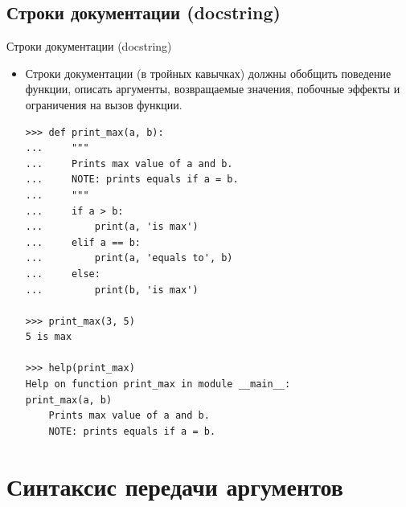 \documentclass[aspectratio=169]{beamer}%
\begin{document}
\subsection{Строки документации (docstring)}
\begin{frame}[fragile]{Строки документации (docstring)}

\scriptsize
\begin{itemize}
\item Строки документации (в тройных кавычках) должны обобщить поведение функции, описать аргументы, возвращаемые значения, побочные эффекты и ограничения на вызов функции.

\begin{verbatim}
>>> def print_max(a, b):
...     """ 
...     Prints max value of a and b.
...     NOTE: prints equals if a = b.
...     """
...     if a > b:
...         print(a, 'is max') 
...     elif a == b:
...         print(a, 'equals to', b)
...     else:
...         print(b, 'is max')

>>> print_max(3, 5)
5 is max

>>> help(print_max)
Help on function print_max in module __main__:
print_max(a, b)
    Prints max value of a and b.
    NOTE: prints equals if a = b.
\end{verbatim}
\end{itemize}
\vfill
\end{frame}


\section{Синтаксис передачи аргументов}
\sectionframe
\end{document}

